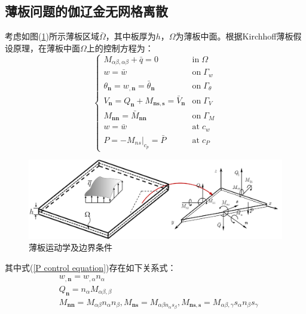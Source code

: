 \subsection{薄板问题的伽辽金无网格离散}
考虑如图(\ref{plate})所示薄板区域$\bar \Omega$，其中板厚为$h$，$\Omega$为薄板中面。根据Kirchhoff薄板假设原理\cite{Liu}，在薄板中面$\Omega$上的控制方程为：
\begin{equation}
    \begin{cases}\label{P control equation}
        M_{\alpha\beta,\alpha\beta}+\bar q=0&\mathrm{in} \; \Omega\\
        w=\bar w&\mathrm{on}\;\Gamma_w\\
        \theta_{\pmb n}=w_{,\pmb n}=\bar \theta_{\pmb n}&\mathrm{on}\;\Gamma_{\theta}\\
        V_{\pmb n}=Q_{\pmb n}+M_{\pmb{ns},\pmb s}=\bar V_{\pmb n}&\mathrm{on}\;\Gamma_V\\
        M_{\pmb{nn}}=\bar M_{\pmb{nn}}&\mathrm{on}\; \Gamma_M\\
        w=\bar w&\mathrm{at} \; c_w\\
        P=-M_{ns}\vert_{c_p}=\bar P&\mathrm{at}\; c_P
    \end{cases}
\end{equation}
\begin{figure}[H]
    \centering
    \includegraphics[scale=0.7]{figure/nomesh/plate.png}
    \caption{薄板运动学及边界条件}\label{plate}
\end{figure}
\noindent
其中式(\ref{P control equation})存在如下关系式：
\begin{subequations}
\begin{align}
\label{wn} &w_{,\pmb n}=w_{,\alpha}n_{\alpha}\\
\label{Qn} &Q_{\pmb n}=n_{\alpha}M_{\alpha\beta,\beta}\\
\label{Mn} &M_{\pmb{nn}}=M_{\alpha\beta}n_{\alpha}n_{\beta},M_{\pmb{ns}}=M_{\alpha\beta n_{\alpha}s_{\beta}},M_{\pmb{ns,s}}=M_{\alpha\beta,\gamma}s_{\alpha}n_{\beta}s_{\gamma}
\end{align}
\end{subequations}
